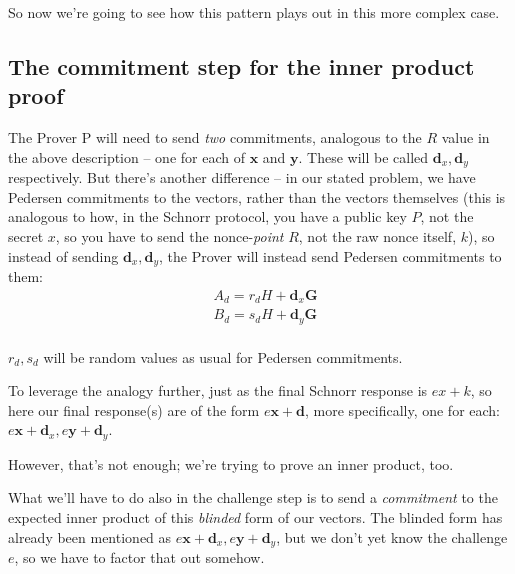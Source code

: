 \documentclass[10pt,a4paper]{article}
\begin{document}
So now we're going to see how this pattern plays out in this more
complex case.

\hypertarget{the-commitment-step-for-the-inner-product-proof}{%
\subsection[The commitment step for the inner product
proof]{\texorpdfstring{\protect\hypertarget{anchor-36}{}{}The commitment
step for the inner product
proof}{The commitment step for the inner product proof}}\label{the-commitment-step-for-the-inner-product-proof}}

The Prover P will need to send \emph{two }commitments, analogous to the
$R$ value in the above description -- one for each of $\mathbf{x}$ and
$\mathbf{y}$. These will be called $\mathbf{d}_x, \mathbf{d}_y$ respectively. But there's another
difference -- in our stated problem, we have Pedersen commitments to the
vectors, rather than the vectors themselves (this is analogous to how,
in the Schnorr protocol, you have a public key $P$, not the secret $x$, so you
have to send the nonce-\emph{point} $R$, not the raw nonce itself, $k$), so
instead of sending $\mathbf{d}_x, \mathbf{d}_y$, the Prover will instead send Pedersen commitments
to them:
\begin{align*}
&A_d = r_d H + \mathbf{d}_x\mathbf{G} \\
&B_d = s_d H + \mathbf{d}_y\mathbf{G} \\
\end{align*}

$r_d, s_d$ will be random values as usual for Pedersen commitments.

To leverage the analogy further, just as the final Schnorr response is $ex+k$,
so here our final response(s) are of the form $e\mathbf{x}+\mathbf{d}$, more specifically, one for each: $e\mathbf{x} + \mathbf{d}_x, e\mathbf{y}+\mathbf{d}_y$.

However, that's not enough; we're trying to prove an inner product, too.

What we'll have to do also in the challenge step is to send a
\emph{commitment} to the expected inner product of this \emph{blinded}
form of our vectors. The blinded form has already been mentioned as $e\mathbf{x} + \mathbf{d}_x, e\mathbf{y}+\mathbf{d}_y$,
but we don't yet know the challenge $e$, so we have to factor that out
somehow.
\end{document}
